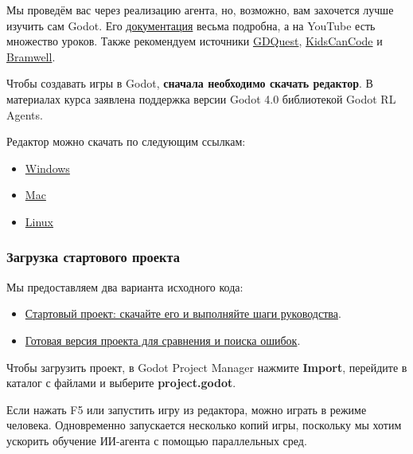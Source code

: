 \documentclass[11pt,a4paper]{article}
\begin{document}
Мы проведём вас через реализацию агента, но, возможно, вам захочется лучше изучить сам Godot. Его \href{https://docs.godotengine.org/en/latest/index.html}{документация} весьма подробна, а на YouTube есть множество уроков. Также рекомендуем источники \href{https://www.gdquest.com/}{GDQuest}, \href{https://kidscancode.org/godot_recipes/4.x/}{KidsCanCode} и \href{https://www.youtube.com/channel/UCczi7Aq_dTKrQPF5ZV5J3gg}{Bramwell}.

Чтобы создавать игры в Godot, \textbf{сначала необходимо скачать редактор}. В материалах курса заявлена поддержка версии Godot 4.0 библиотекой Godot RL Agents.

Редактор можно скачать по следующим ссылкам:

\begin{itemize}
\item
  \href{https://downloads.tuxfamily.org/godotengine/4.0.1/Godot_v4.0.1-stable_win64.exe.zip}{Windows}
\item
  \href{https://downloads.tuxfamily.org/godotengine/4.0.1/Godot_v4.0.1-stable_macos.universal.zip}{Mac}
\item
  \href{https://downloads.tuxfamily.org/godotengine/4.0.1/Godot_v4.0.1-stable_linux.x86_64.zip}{Linux}
\end{itemize}

\subsubsection{Загрузка стартового проекта}\label{loading-the-starter-project}

Мы предоставляем два варианта исходного кода:

\begin{itemize}
\item
  \href{https://drive.google.com/file/d/1C7xd3TibJHlxFEJPBgBLpksgxrFZ3D8e/view?usp=share_link}{Стартовый проект: скачайте его и выполняйте шаги руководства}.
\item
  \href{https://drive.google.com/file/d/1k-b2Bu7uIA6poApbouX4c3sq98xqogpZ/view?usp=share_link}{Готовая версия проекта для сравнения и поиска ошибок}.
\end{itemize}

Чтобы загрузить проект, в Godot Project Manager нажмите \textbf{Import}, перейдите в каталог с файлами и выберите \textbf{project.godot}.

Если нажать F5 или запустить игру из редактора, можно играть в режиме человека. Одновременно запускается несколько копий игры, поскольку мы хотим ускорить обучение ИИ-агента с помощью параллельных сред.
\end{document}
